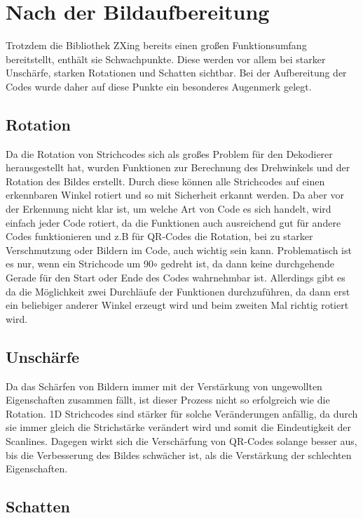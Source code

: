 \section{Nach der Bildaufbereitung}
\writtenby{\dcauthornameriren}%
Trotzdem die Bibliothek ZXing bereits einen großen Funktionsumfang bereitstellt, enthält sie Schwachpunkte. Diese werden vor allem bei starker Unschärfe, starken Rotationen und Schatten sichtbar.
Bei der Aufbereitung der Codes wurde daher auf diese Punkte ein besonderes Augenmerk gelegt.


\subsection*{Rotation}
Da die Rotation von Strichcodes sich als großes Problem für den Dekodierer herausgestellt hat, wurden Funktionen zur Berechnung des Drehwinkels und der Rotation des Bildes erstellt. Durch diese können alle Strichcodes auf einen erkennbaren Winkel rotiert und so mit Sicherheit erkannt werden.
Da aber vor der Erkennung nicht klar ist, um welche Art von Code es sich handelt, wird einfach jeder Code rotiert, da die Funktionen auch ausreichend gut für andere Codes funktionieren und z.B für QR-Codes die Rotation, bei zu starker Verschmutzung oder Bildern im Code, auch wichtig sein kann.
Problematisch ist es nur, wenn ein Strichcode um 90$ \circ $ gedreht ist, da dann keine durchgehende Gerade für den Start oder Ende des Codes wahrnehmbar ist. Allerdings gibt es da die Möglichkeit zwei Durchläufe der Funktionen durchzuführen, da dann erst ein beliebiger anderer Winkel erzeugt wird und beim zweiten Mal richtig rotiert wird.


\subsection*{Unschärfe}
Da das Schärfen von Bildern immer mit der Verstärkung von ungewollten Eigenschaften zusammen fällt, ist dieser Prozess nicht so erfolgreich wie die Rotation. 1D Strichcodes sind stärker für solche Veränderungen anfällig, da durch sie immer gleich die Strichstärke verändert wird und somit die Eindeutigkeit der Scanlines. Dagegen wirkt sich die Verschärfung von QR-Codes solange besser aus, bis die Verbesserung des Bildes schwächer ist, als die Verstärkung der schlechten Eigenschaften. 


\subsection*{Schatten}




